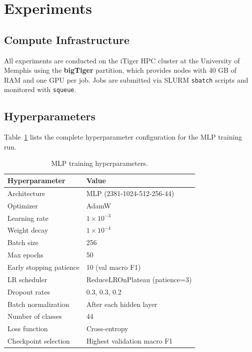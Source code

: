 \documentclass[11pt]{article}
\begin{document}
\section{Experiments}
\label{sec:experiments}

\subsection{Compute Infrastructure}

All experiments are conducted on the iTiger HPC cluster at the
University of Memphis using the \textbf{bigTiger} partition, which
provides nodes with 40 GB of RAM and one GPU per job. Jobs are submitted
via SLURM \texttt{sbatch} scripts and monitored with \texttt{squeue}.

\subsection{Hyperparameters}

Table~\ref{tab:hparams} lists the complete hyperparameter configuration
for the MLP training run.

\begin{table}[h]
\centering
\small
\begin{tabular}{ll}
\toprule
\textbf{Hyperparameter} & \textbf{Value} \\
\midrule
Architecture            & MLP (2381-1024-512-256-44) \\
Optimizer               & AdamW \\
Learning rate           & $1 \times 10^{-3}$ \\
Weight decay            & $1 \times 10^{-4}$ \\
Batch size              & 256 \\
Max epochs              & 50 \\
Early stopping patience & 10 (val macro F1) \\
LR scheduler            & ReduceLROnPlateau (patience=3) \\
Dropout rates           & 0.3, 0.3, 0.2 \\
Batch normalization     & After each hidden layer \\
Number of classes       & 44 \\
Loss function           & Cross-entropy \\
Checkpoint selection    & Highest validation macro F1 \\
\bottomrule
\end{tabular}
\caption{MLP training hyperparameters.}
\label{tab:hparams}
\end{table}
\end{document}
